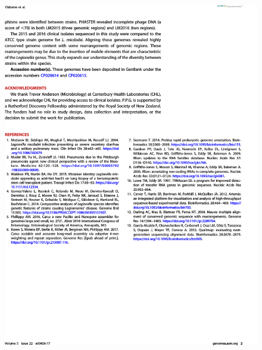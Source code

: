 \begin{figure}
    \centering
    \includegraphics[width=\linewidth]{other/legionella_2.png}
\end{figure}
\cleardoublepage

\footnotesize
